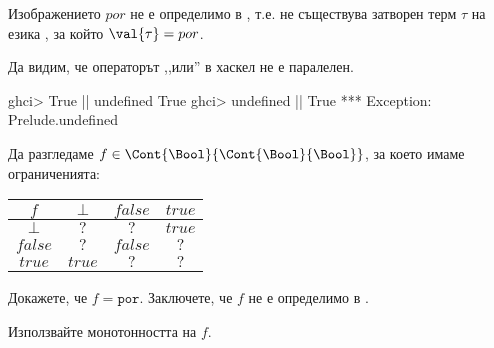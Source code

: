 

\begin{framed}
  \begin{lemma}
    Изображението $por$ не е определимо в \PCFPP, т.е. не съществува затворен терм $\tau$ на езика \PCFPP,
    за който $\val{\tau} = por$.
  \end{lemma}
\end{framed}

\begin{example}
Да видим, че операторът ,,или'' в хаскел не е паралелен.
\begin{haskellcode}
ghci> True || undefined
True
ghci> undefined || True
*** Exception: Prelude.undefined
\end{haskellcode}
\end{example}

\begin{problem}\label{prob:pcf:full-abstraction:por}
  Да разгледаме $f \in \Cont{\Bool}{\Cont{\Bool}{\Bool}}$, за което имаме ограниченията:

  \vspace{10pt}
  
  \begin{tabular}{|c|c|c|c|}
    \hline
    $f$ & $\bot$ & $false$ & $true$\\
    \hline
    $\bot$ & $?$ & $?$ & $true$\\
    \hline
    $false$ & $?$ & $false$ & $?$\\
    \hline
    $true$ & $true$ & $?$ & $?$\\
    \hline
  \end{tabular}

  \vspace{10pt}
  
  Докажете, че $f = \texttt{por}$.
  Заключете, че $f$ не е определимо в \PCFPP.
  
\end{problem}
\begin{hint}
  Използвайте монотонността на $f$.
\end{hint}



